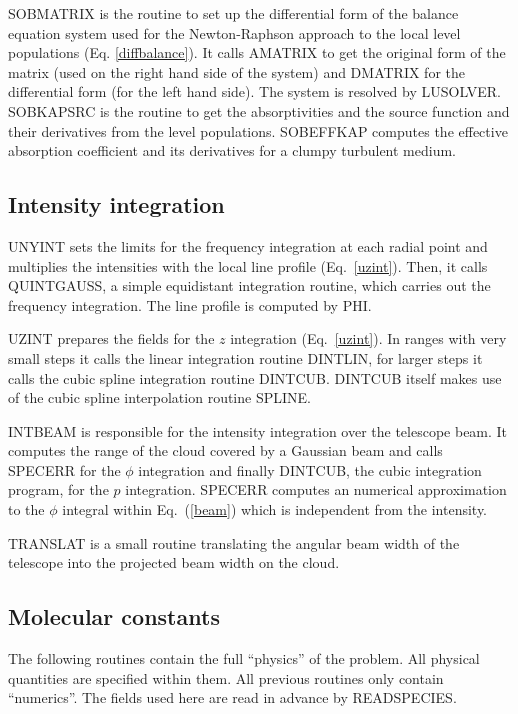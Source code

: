 SOBMATRIX is the routine to set up the differential form of the
balance equation system used for the Newton-Raphson approach
to the local level populations (Eq. \ref{diffbalance}). It calls AMATRIX to get the
original form of the matrix (used on the right hand side of the system)
and DMATRIX for the differential form (for the left hand side).
The system is resolved by LUSOLVER. SOBKAPSRC is the routine
to get the absorptivities and the source function and their derivatives
from the level populations. SOBEFFKAP computes the effective absorption
coefficient and its derivatives for a clumpy turbulent medium.

\subsection{Intensity integration}

UNYINT sets the limits for the frequency integration at each
radial point and multiplies the intensities with the local
line profile (Eq.\ \ref{uzint}). Then, it calls QUINTGAUSS, 
a simple equidistant integration routine, which carries out the
frequency integration. The line profile is computed by PHI.

UZINT prepares the fields for the $z$ integration (Eq.\ \ref{uzint}).
In ranges with very small steps it calls the linear integration
routine DINTLIN, for larger steps it calls the cubic spline integration
routine DINTCUB. DINTCUB itself makes use of the cubic spline 
interpolation routine SPLINE.

INTBEAM is responsible for the intensity integration over
the telescope beam. It computes the range of the cloud covered
by a Gaussian beam and calls SPECERR for the $\phi$ integration
and finally DINTCUB, the cubic integration program, for the
$p$ integration. 
SPECERR computes an numerical approximation to the $\phi$
integral within Eq.\ (\ref{beam}) which is independent from
the intensity.

TRANSLAT is a small routine translating the angular beam width
of the telescope into the projected beam width on the cloud.

\subsection{Molecular constants}

The following routines contain the full ``physics'' of the problem.
All physical quantities are specified within them. All previous
routines only contain ``numerics''. The fields used here are
read in advance by READSPECIES.

